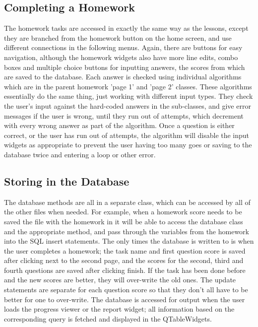 \subsection{Completing a Homework}

The homework tasks are accessed in exactly the same way as the lessons, except they are branched from the homework button on the home screen, and use different connections in the following menus. Again, there are buttons for easy navigation, although the homework widgets also have more line edits, combo boxes and multiple choice buttons for inputting answers, the scores from which are saved to the database. Each answer is checked using individual algorithms which are in the parent homework 'page 1' and 'page 2' classes. These algorithms essentially do the same thing, just working with different input types. They check the user's input against the hard-coded answers in the sub-classes, and give error messages if the user is wrong, until they run out of attempts, which decrement with every wrong answer as part of the algorithm. Once a question is either correct, or the user has run out of attempts, the algorithm will disable the input widgets as appropriate to prevent the user having too many goes or saving to the database twice and entering a loop or other error.

\subsection{Storing in the Database}

The database methods are all in a separate class, which can be accessed by all of the other files when needed. For example, when a homework score needs to be saved the file with the homework in it will be able to access the database class and the appropriate method, and pass through the variables from the homework into the SQL insert statements. The only times the database is written to is when the user completes a homework; the task name and first question score is saved after clicking next to the second page, and the scores for the second, third and fourth questions are saved after clicking finish. If the task has been done before and the new scores are better, they will over-write the old ones. The update statements are separate for each question score so that they don't all have to be better for one to over-write. The database is accessed for output when the user loads the progress viewer or the report widget; all information based on the corresponding query is fetched and displayed in the QTableWidgets.


